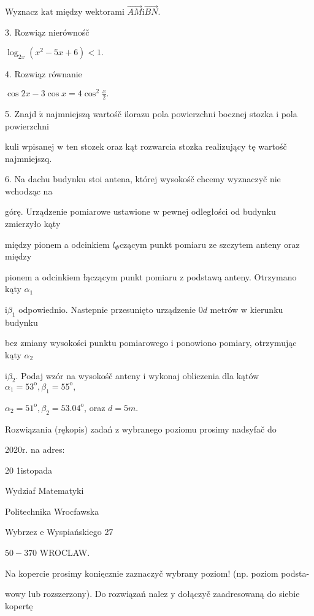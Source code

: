 \documentclass[a4paper,12pt]{article}
\begin{document}
Wyznacz $\mathrm{k}\mathrm{a}\mathrm{t}$ między wektorami $\vec{AM}\mathrm{i}\vec{BN}.$

3. Rozwiąz nierównośč

$\log_{2x}(x^{2}-5x+6)<1.$

4. Rozwiąz równanie

$\displaystyle \cos 2x-3\cos x=4\cos^{2}\frac{x}{2}.$

5. Znajd $\acute{\mathrm{z}}$ najmniejszą wartośč ilorazu pola powierzchni bocznej stozka $\mathrm{i}$ pola powierzchni

kuli wpisanej $\mathrm{w}$ ten stozek oraz kąt rozwarcia stozka realizujący tę wartośč najmniejszq.

6. Na dachu budynku stoi antena, której wysokośč chcemy wyznaczyč nie wchodząc na

górę. Urządzenie pomiarowe ustawione $\mathrm{w}$ pewnej odległości od budynku zmierzyło kąty

między pionem a odcinkiem $l_{\Phi}$czącym punkt pomiaru ze szczytem anteny oraz między

pionem a odcinkiem łączącym punkt pomiaru $\mathrm{z}$ podstawą anteny. Otrzymano kąty $\alpha_{1}$

$\mathrm{i}\beta_{1}$ odpowiednio. Nastepnie przesunięto urządzenie $0d$ metrów $\mathrm{w}$ kierunku budynku

bez zmiany wysokości punktu pomiarowego $\mathrm{i}$ ponowiono pomiary, otrzymując kąty $\alpha_{2}$

$\mathrm{i}\beta_{2}$. Podaj wzór na wysokośč anteny $\mathrm{i}$ wykonaj obliczenia dla kątów $\alpha_{1}=53^{\mathrm{o}}, \beta_{1}=55^{\mathrm{o}},$

$\alpha_{2}=51^{\mathrm{o}}, \beta_{2}=53.04^{\mathrm{o}}$, oraz $d=5m.$

Rozwiązania (rękopis) zadań z wybranego poziomu prosimy nadsyfač do

2020r. na adres:

20 1istopada

Wydziaf Matematyki

Politechnika Wrocfawska

Wybrzez $\mathrm{e}$ Wyspiańskiego 27

$50-370$ WROCLAW.

Na kopercie prosimy $\underline{\mathrm{k}\mathrm{o}\mathrm{n}\mathrm{i}\mathrm{e}\mathrm{c}\mathrm{z}\mathrm{n}\mathrm{i}\mathrm{e}}$ zaznaczyč wybrany poziom! (np. poziom podsta-

wowy lub rozszerzony). Do rozwiązań nalez $\mathrm{y}$ dołączyč zaadresowaną do siebie kopertę
\end{document}
